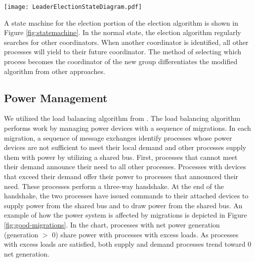 \begin{figure*}[!t]
\texttt{[image: LeaderElectionStateDiagram.pdf]}
\caption[State machine for an election]{State machine for an election. Processes start as coordinators in the ``Normal'' state and search for other coordinators to join with. Processes immediately respond to \ac{AYC} messages they receive. The algorithm was modified by adding a ``Ready Acknowledgment'' message as the final step of completing the election. Additionally, processes only accept invites if they have received an ``\ac{AYC} Response'' message from the inviting process.}
\label{fig:statemachine}
\end{figure*}

A state machine for the election portion of the election algorithm is shown in Figure \ref{fig:statemachine}.
In the normal state, the election algorithm regularly searches for other coordinators.
When another coordinator is identified, all other processes will yield to their future coordinator.
The method of selecting which process becomes the coordinator of the new group differentiates the modified algorithm from other approaches.

\subsection{Power Management}

We utilized the load balancing algorithm from \cite{LOADBALANCING}.
The load balancing algorithm performs work by managing power devices with a sequence of migrations\cite{HILTESTBED}.
In each migration, a sequence of message exchanges identify processes whose power devices are not sufficient to meet their local demand and other processes supply them with power by utilizing a shared bus.
First, processes that cannot meet their demand announce their need to all other processes.
Processes with devices that exceed their demand offer their power to processes that announced their need.
These processes perform a three-way handshake.
At the end of the handshake, the two processes have issued commands to their attached devices to supply power from the shared bus and to draw power from the shared bus.
An example of how the power system is affected by migrations is depicted in Figure \ref{fig:good-migrations}.
In the chart, processes with net power generation (generation $>$ 0) share power with processes with excess loads.
As processes with excess loads are satisfied, both supply and demand processes trend toward 0 net generation.

